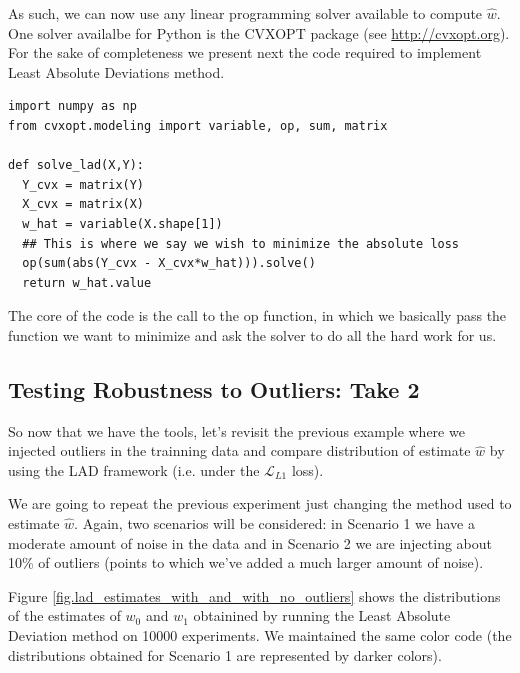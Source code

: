 As such, we can now use any linear programming solver available to compute $\hat{w}$. One solver availalbe for Python is the CVXOPT package (see \url{http://cvxopt.org}). For the sake of completeness we present next the code required to implement Least Absolute Deviations method. 

\begin{lstlisting}
import numpy as np
from cvxopt.modeling import variable, op, sum, matrix

def solve_lad(X,Y):
  Y_cvx = matrix(Y)
  X_cvx = matrix(X)
  w_hat = variable(X.shape[1])
  ## This is where we say we wish to minimize the absolute loss
  op(sum(abs(Y_cvx - X_cvx*w_hat))).solve()
  return w_hat.value
\end{lstlisting}

The core of the code is the call to the op function, in which we basically pass the function we want to minimize and ask the solver to do all the hard work for us.


\subsection{Testing Robustness to Outliers: Take 2}
So now that we have the tools, let's revisit the previous example where we injected outliers in the trainning data and compare distribution of estimate $\hat{w}$ by using the LAD framework (i.e. under the $\mathcal{L}_{L1}$ loss).

We are going to repeat the previous experiment just changing the method used to estimate $\hat{w}$. Again, two scenarios will be considered: in Scenario 1 we have a moderate amount of noise in the data and in Scenario 2 we are injecting about 10\% of outliers (points to which we've added a much larger amount of noise). 

Figure \ref{fig.lad_estimates_with_and_with_no_outliers} shows the distributions of the estimates of $w_0$ and $w_1$ obtainined by running the Least Absolute Deviation method on 10000 experiments. We maintained the same color code (the distributions obtained for Scenario 1 are represented by darker colors).

